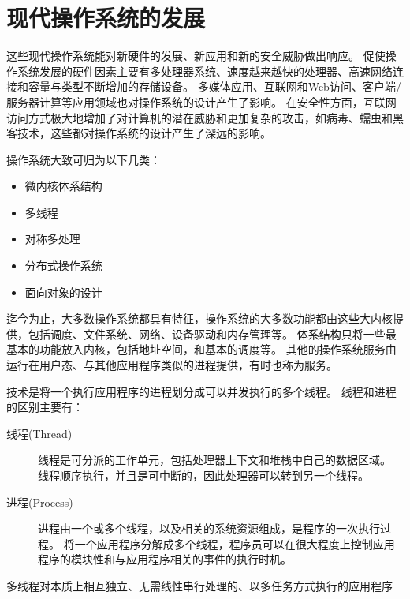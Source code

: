 
\section{现代操作系统的发展}
{
    这些现代操作系统能对新硬件的发展、新应用和新的安全威胁做出响应。
    促使操作系统发展的硬件因素主要有多处理器系统、速度越来越快的处理器、高速网络连接和容量与类型不断增加的存储设备。
    多媒体应用、互联网和Web访问、客户端/服务器计算等应用领域也对操作系统的设计产生了影响。
    在安全性方面，互联网访问方式极大地增加了对计算机的潜在威胁和更加复杂的攻击，如病毒、蠕虫和黑客技术，这些都对操作系统的设计产生了深远的影响。

    操作系统大致可归为以下几类：

    \begin{itemize}
        \item 微内核体系结构
        \item 多线程
        \item 对称多处理
        \item 分布式操作系统
        \item 面向对象的设计
    \end{itemize}

    迄今为止，大多数操作系统都具有特征，操作系统的大多数功能都由这些大内核提供，包括调度、文件系统、网络、设备驱动和内存管理等。
    体系结构只将一些最基本的功能放入内核，包括地址空间，和基本的调度等。
    其他的操作系统服务由运行在用户态、与其他应用程序类似的进程提供，有时也称为服务。

    技术是将一个执行应用程序的进程划分成可以并发执行的多个线程。
    线程和进程的区别主要有：

    \begin{description}
        \item[线程(Thread)]
        {
            线程是可分派的工作单元，包括处理器上下文和堆栈中自己的数据区域。
            线程顺序执行，并且是可中断的，因此处理器可以转到另一个线程。
        }
        \item[进程(Process)]
        {
            进程由一个或多个线程，以及相关的系统资源组成，是程序的一次执行过程。
            将一个应用程序分解成多个线程，程序员可以在很大程度上控制应用程序的模块性和与应用程序相关的事件的执行时机。
        }
    \end{description}

    多线程对本质上相互独立、无需线性串行处理的、以多任务方式执行的应用程序
}
